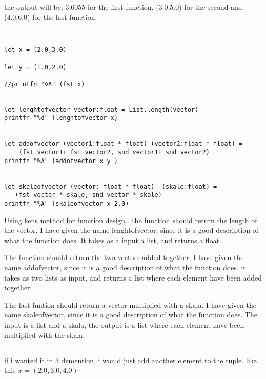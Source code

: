 \documentclass{article}
\begin{document}
the output will be, 3,6055 for the first function. (3.0,5.0) for the second and (4.0,6.0) for the last function.


\subsection{}


    \begin{lstlisting}

let x = (2.0,3.0)

let y = (1.0,2.0)

//printfn "%A" (fst x)


let lenghtofvector vector:float = List.length(vector)
printfn "%d" (lenghtofvector x)


let addofvector (vector1:float * float) (vector2:float * float) = 
    (fst vector1+ fst vector2, snd vector1+ snd vector2)
printfn "%A" (addofvector x y )


let skaleofvector (vector: float * float)  (skale:float) = 
   (fst vector * skale, snd vector * skale)
printfn "%A" (skaleofvector x 2.0)
    \end{lstlisting}


Using kens method for function design. The function should return the length of the vector. I have given the name lenghtofvector, since it is a good description of what the function does. It takes as a input a list, and returns a float. 

The function should return the two vectors added together. I have given the name addofvector, since it is a good description of what the function does. it takes as two lists as input, and returns a list where each element have been added together. 

The last funtion should return a vector multiplied with a skala. I have given the name skaleofvector, since it is a good description of what the function does. The input is a list and a skala, the output is a list where each element have been multiplied with the skala. 

\subsection{}
if i wanted it in 3 demention, i would just add another element to the tuple. like this
$x = (2.0, 3.0, 4.0)$




\section{}
\end{document}
